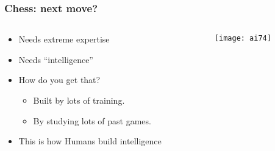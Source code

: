 \begin{frame}[fragile]\frametitle{Chess: next move?}

\begin{columns}
    \begin{column}[T]{0.6\linewidth}

\begin{itemize}
\item Needs extreme expertise
\item Needs ``intelligence''
\item How do you get that?
\begin{itemize}
\item Built by lots of training.
\item By studying lots of past games.
\end{itemize}
\item This is how Humans build intelligence
\end{itemize}

    \end{column}
    \begin{column}[T]{0.4\linewidth}

			\begin{center}
			\texttt{[image: ai74]}
			\end{center}
			
    \end{column}
  \end{columns}
  
  

\end{frame}

